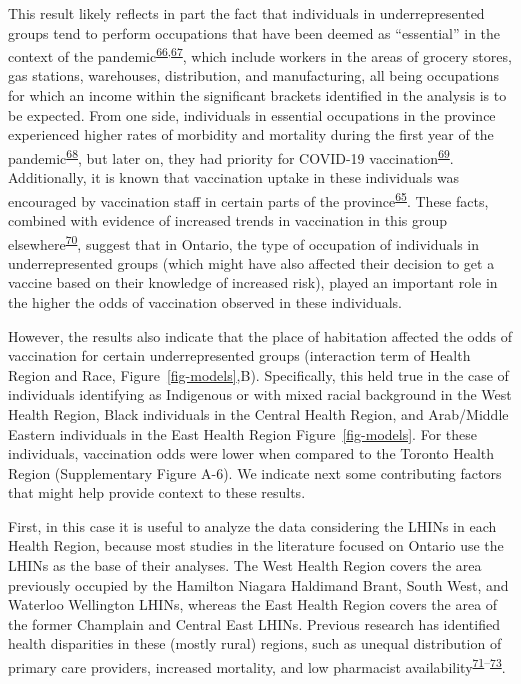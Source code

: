 \documentclass[
]{article}
\begin{document}
This result likely reflects in part the fact that individuals in
underrepresented groups tend to perform occupations that have been
deemed as ``essential'' in the context of the
pandemic\textsuperscript{\protect\hyperlink{ref-hawkins2020}{66},\protect\hyperlink{ref-ct2021}{67}},
which include workers in the areas of grocery stores, gas stations,
warehouses, distribution, and manufacturing, all being occupations for
which an income within the significant brackets identified in the
analysis is to be expected. From one side, individuals in essential
occupations in the province experienced higher rates of morbidity and
mortality during the first year of the
pandemic\textsuperscript{\protect\hyperlink{ref-rao2021}{68}}, but later
on, they had priority for COVID-19
vaccination\textsuperscript{\protect\hyperlink{ref-mishra2021}{69}}.
Additionally, it is known that vaccination uptake in these individuals
was encouraged by vaccination staff in certain parts of the
province\textsuperscript{\protect\hyperlink{ref-gill2022}{65}}. These
facts, combined with evidence of increased trends in vaccination in this
group
elsewhere\textsuperscript{\protect\hyperlink{ref-nguyen2021b}{70}},
suggest that in Ontario, the type of occupation of individuals in
underrepresented groups (which might have also affected their decision
to get a vaccine based on their knowledge of increased risk), played an
important role in the higher the odds of vaccination observed in these
individuals.

However, the results also indicate that the place of habitation affected
the odds of vaccination for certain underrepresented groups (interaction
term of Health Region and Race, Figure~\ref{fig-models},B).
Specifically, this held true in the case of individuals identifying as
Indigenous or with mixed racial background in the West Health Region,
Black individuals in the Central Health Region, and Arab/Middle Eastern
individuals in the East Health Region Figure~\ref{fig-models}. For these
individuals, vaccination odds were lower when compared to the Toronto
Health Region (Supplementary Figure A-6). We indicate next some
contributing factors that might help provide context to these results.

First, in this case it is useful to analyze the data considering the
LHINs in each Health Region, because most studies in the literature
focused on Ontario use the LHINs as the base of their analyses. The West
Health Region covers the area previously occupied by the Hamilton
Niagara Haldimand Brant, South West, and Waterloo Wellington LHINs,
whereas the East Health Region covers the area of the former Champlain
and Central East LHINs. Previous research has identified health
disparities in these (mostly rural) regions, such as unequal
distribution of primary care providers, increased mortality, and low
pharmacist
availability\textsuperscript{\protect\hyperlink{ref-shah2019}{71}--\protect\hyperlink{ref-timony2022}{73}}.
\end{document}

